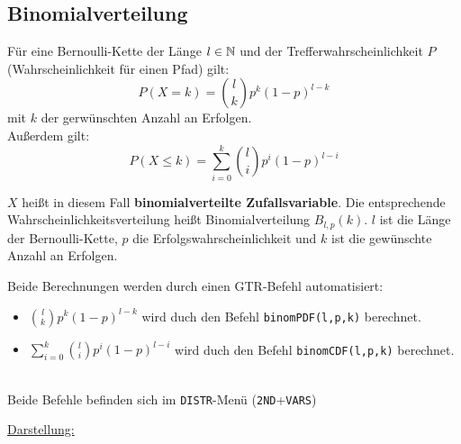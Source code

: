 \documentclass[../MAIN/main.tex]{subfiles}
\begin{document}
\subsection{Binomialverteilung}
\begin{Theorem}
  Für eine Bernoulli-Kette der Länge $l \in \mathbb{N}$ und der Trefferwahrscheinlichkeit $P$ (Wahrscheinlichkeit für einen Pfad) gilt:
  $$P(X=k) = {l \choose k} p^k (1-p) ^{l-k}$$
  mit $k$ der gerwünschten Anzahl an Erfolgen.\\
  Außerdem gilt:
  $$P(X\leq k) = \sum_{i=0}^{k}{l \choose i} p^i (1-p) ^{l-i}$$
\end{Theorem}
\begin{Bemerkung}
  \begin{Definition}
    $X$ heißt in diesem Fall \textbf{binomialverteilte Zufallsvariable}. Die entsprechende Wahrscheinlichkeitsverteilung heißt Binomialverteilung $B_{l,p}(k)$. $l$ ist die Länge der Bernoulli-Kette, $p$ die Erfolgswahrscheinlichkeit und $k$ ist die gewünschte Anzahl an Erfolgen.
  \end{Definition}
\end{Bemerkung}
\begin{GTR-Tipp}
  Beide Berechnungen werden durch einen GTR-Befehl automatisiert:\\
  \begin{itemize}
    \item $\displaystyle{{l \choose k}} p^k (1-p) ^{l-k}$ wird duch den Befehl \texttt{binomPDF(l,p,k)} berechnet.
    \item $\displaystyle{\sum_{i=0}^{k}{l \choose i}} p^i (1-p) ^{l-i}$ wird duch den Befehl \texttt{binomCDF(l,p,k)} berechnet.
  \end{itemize}\\
  Beide Befehle befinden sich im \texttt{DISTR}-Menü (\texttt{2ND}+\texttt{VARS})
\end{GTR-Tipp}
\underline{Darstellung:}\\
\begin{minipage}{0.5\textwidth}
\end{minipage}
\begin{minipage}{0.5\textwidth}
\end{minipage}
\end{document}
